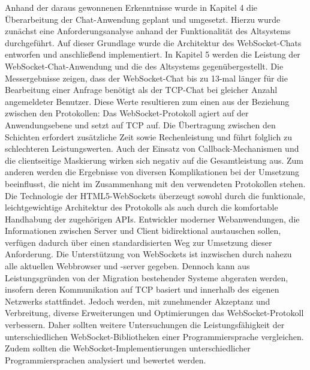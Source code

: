 \documentclass[11pt,a4paper,titlepage]{scrartcl}
\numberwithin{equation}{section}
\begin{document}
\noindent Anhand der daraus gewonnenen Erkenntnisse wurde in Kapitel 4 die Überarbeitung der Chat-Anwendung geplant und umgesetzt. Hierzu wurde zunächst eine Anforderungsanalyse anhand der Funktionalität des Altsystems durchgeführt. Auf dieser Grundlage wurde die Architektur des WebSocket-Chats entworfen und anschließend implementiert. In Kapitel 5 werden die Leistung der WebSocket-Chat-Anwendung und die des Altsystems gegenübergestellt. Die Messergebnisse zeigen, dass der WebSocket-Chat bis zu 13-mal länger für die Bearbeitung einer Anfrage benötigt als der TCP-Chat bei gleicher Anzahl angemeldeter Benutzer. Diese Werte resultieren zum einen aus der Beziehung zwischen den Protokollen: Das WebSocket-Protokoll agiert auf der Anwendungsebene und setzt auf TCP auf. Die Übertragung zwischen den Schichten erfordert zusätzliche Zeit sowie Rechenleistung und führt folglich zu schlechteren Leistungswerten. Auch der Einsatz von Callback-Mechanismen und die clientseitige Maskierung wirken sich negativ auf die Gesamtleistung aus. Zum anderen werden die Ergebnisse von diversen Komplikationen bei der Umsetzung beeinflusst, die nicht im Zusammenhang mit den verwendeten Protokollen stehen. \\

\noindent Die Technologie der HTML5-WebSockets überzeugt sowohl durch die funktionale, leichtgewichtige Architektur des Protokolls als auch durch die komfortable Handhabung der zugehörigen APIs. Entwickler moderner Webanwendungen, die Informationen zwischen Server und Client bidirektional austauschen sollen, verfügen dadurch über einen standardisierten Weg zur Umsetzung dieser Anforderung. Die Unterstützung von WebSockets ist inzwischen durch nahezu alle aktuellen Webbrowser und -server gegeben. Dennoch kann aus Leistungsgründen von der Migration bestehender Systeme abgeraten werden, insofern deren Kommunikation auf TCP basiert und innerhalb des eigenen Netzwerks stattfindet. Jedoch werden, mit zunehmender Akzeptanz und Verbreitung, diverse Erweiterungen und Optimierungen das WebSocket-Protokoll verbessern. Daher sollten weitere Untersuchungen die Leistungsfähigkeit der unterschiedlichen WebSocket-Bibliotheken einer Programmiersprache vergleichen. Zudem sollten die WebSocket-Implementierungen unterschiedlicher Programmiersprachen analysiert und bewertet werden. 

\newpage
\appendix
{}
\printbibliography
\newpage
\listoffigures
\newpage
\listoftables
\newpage
\lstlistoflistings
\newpage
\end{document}
